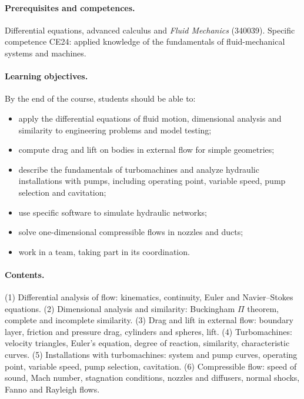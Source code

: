 \documentclass[11pt]{article}
\begin{document}
\paragraph{Prerequisites and competences.} Differential equations, advanced calculus and
\emph{Fluid Mechanics} (340039). Specific competence CE24: applied knowledge of the
fundamentals of fluid-mechanical systems and machines.

\paragraph{Learning objectives.} By the end of the course, students should be able to:
\begin{itemize}
  \item apply the differential equations of fluid motion, dimensional analysis and
  similarity to engineering problems and model testing;
  \item compute drag and lift on bodies in external flow for simple geometries;
  \item describe the fundamentals of turbomachines and analyze hydraulic installations
  with pumps, including operating point, variable speed, pump selection and cavitation;
  \item use specific software to simulate hydraulic networks;
  \item solve one-dimensional compressible flows in nozzles and ducts;
  \item work in a team, taking part in its coordination.
\end{itemize}

\paragraph{Contents.} (1) Differential analysis of flow: kinematics, continuity, Euler and
Navier--Stokes equations. (2) Dimensional analysis and similarity: Buckingham $\Pi$
theorem, complete and incomplete similarity. (3) Drag and lift in external flow: boundary
layer, friction and pressure drag, cylinders and spheres, lift. (4) Turbomachines:
velocity triangles, Euler's equation, degree of reaction, similarity, characteristic
curves. (5) Installations with turbomachines: system and pump curves, operating point,
variable speed, pump selection, cavitation. (6) Compressible flow: speed of sound, Mach
number, stagnation conditions, nozzles and diffusers, normal shocks, Fanno and Rayleigh
flows.
\end{document}
